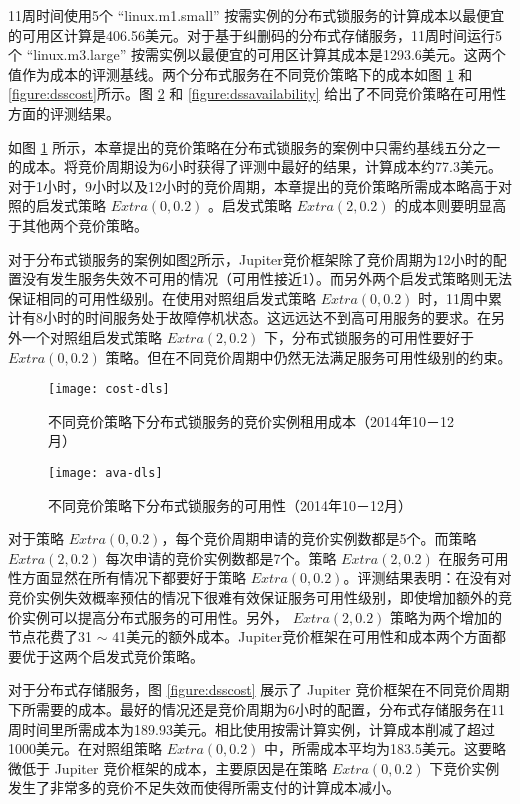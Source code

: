 11周时间使用5个 ``linux.m1.small'' 按需实例的分布式锁服务的计算成本以最便宜的可用区计算是406.56美元。对于基于纠删码的分布式存储服务，11周时间运行5个 ``linux.m3.large'' 按需实例以最便宜的可用区计算其成本是1293.6美元。这两个值作为成本的评测基线。两个分布式服务在不同竞价策略下的成本如图 \ref{figure:dlscost} 和 \ref{figure:dsscost}所示。图 \ref{figure:dlsavailability} 和 \ref{figure:dssavailability} 给出了不同竞价策略在可用性方面的评测结果。

如图 \ref{figure:dlscost} 所示，本章提出的竞价策略在分布式锁服务的案例中只需约基线五分之一的成本。将竞价周期设为6小时获得了评测中最好的结果，计算成本约77.3美元。对于1小时，9小时以及12小时的竞价周期，本章提出的竞价策略所需成本略高于对照的启发式策略 $Extra(0, 0.2)$ 。启发式策略 $Extra(2, 0.2)$ 的成本则要明显高于其他两个竞价策略。

对于分布式锁服务的案例如图\ref{figure:dlsavailability}所示，Jupiter竞价框架除了竞价周期为12小时的配置没有发生服务失效不可用的情况（可用性接近1）。而另外两个启发式策略则无法保证相同的可用性级别。在使用对照组启发式策略 $Extra(0, 0.2)$ 时，11周中累计有8小时的时间服务处于故障停机状态。这远远达不到高可用服务的要求。在另外一个对照组启发式策略 $Extra(2, 0.2)$ 下，分布式锁服务的可用性要好于 $Extra(0, 0.2)$ 策略。但在不同竞价周期中仍然无法满足服务可用性级别的约束。
\begin{figure}
  \centering
  \texttt{[image: cost-dls]}
  \caption{不同竞价策略下分布式锁服务的竞价实例租用成本（2014年10－12月）}
  \label{figure:dlscost}
\end{figure}
\begin{figure}
  \centering
  \texttt{[image: ava-dls]}
  \caption{不同竞价策略下分布式锁服务的可用性（2014年10－12月）}
  \label{figure:dlsavailability}
\end{figure}

对于策略 $Extra(0, 0.2)$，每个竞价周期申请的竞价实例数都是5个。而策略 $Extra(2, 0.2)$ 每次申请的竞价实例数都是7个。策略 $Extra(2, 0.2)$ 在服务可用性方面显然在所有情况下都要好于策略 $Extra(0, 0.2)$。评测结果表明：在没有对竞价实例失效概率预估的情况下很难有效保证服务可用性级别，即使增加额外的竞价实例可以提高分布式服务的可用性。另外， $Extra(2, 0.2)$ 策略为两个增加的节点花费了31 $\sim$ 41美元的额外成本。Jupiter竞价框架在可用性和成本两个方面都要优于这两个启发式竞价策略。

对于分布式存储服务，图 \ref{figure:dsscost} 展示了 Jupiter 竞价框架在不同竞价周期下所需要的成本。最好的情况还是竞价周期为6小时的配置，分布式存储服务在11周时间里所需成本为189.93美元。相比使用按需计算实例，计算成本削减了超过1000美元。在对照组策略 $Extra(0, 0.2)$ 中，所需成本平均为183.5美元。这要略微低于 Jupiter 竞价框架的成本，主要原因是在策略 $Extra(0, 0.2)$ 下竞价实例发生了非常多的竞价不足失效而使得所需支付的计算成本减小。

